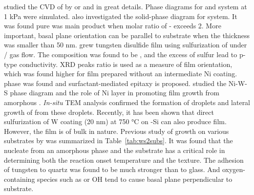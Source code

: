 \citeauthor{Lee1994} studied the CVD of  by  or  and  in great details. Phase diagrams for  and  system at 1 kPa were simulated.\cite{Lee1994} \citeauthor{Endler1999} also investigated the solid-phase diagram for  system.\cite{Endler1999} It was found pure  was main product when molar ratio of - exceeds 2. More important,  basal plane orientation can be parallel to substrate when the thickness was smaller than 50 nm. \citeauthor{Ennaoui1995a} grew tungsten disulfide film using sulfurization of  under / gas flow.\cite{Ennaoui1995a} The composition was found to be , and the excess of sulfur lead to p-type conductivity. XRD peaks ratio is used as a measure of film orientation, which was found higher for film prepared without an intermediate Ni coating.  phase was found and surfactant-mediated epitaxy is proposed. \citeauthor{Regula1997} studied the Ni-W-S phase diagram and the role of Ni layer in promoting  film growth from amorphous .\cite{Regula1997} \emph{In-situ} TEM analysis confirmed the formation of  droplets and lateral growth of  from these droplets.\cite{Regula1998} Recently, it has been shown that direct sulfurization of W coating (20 nm) at 750 \si{\degreeCelsius} on -Si can also produce  film.\cite{Shanmugam2012a} However, the film is of bulk in nature. Previous study of  growth on various substrates by \citeauthor{Genut1992} was summarized in Table~\ref{tab:ws2subs}.\cite{Genut1992} It was found that the  nucleate from an amorphous  phase and the substrate has a critical role in determining both the reaction onset temperature and the texture. The adhesion of tungsten to quartz was found to be much stronger than to glass. And oxygen-containing species such as  or OH tend to cause  basal plane perpendicular to substrate.
